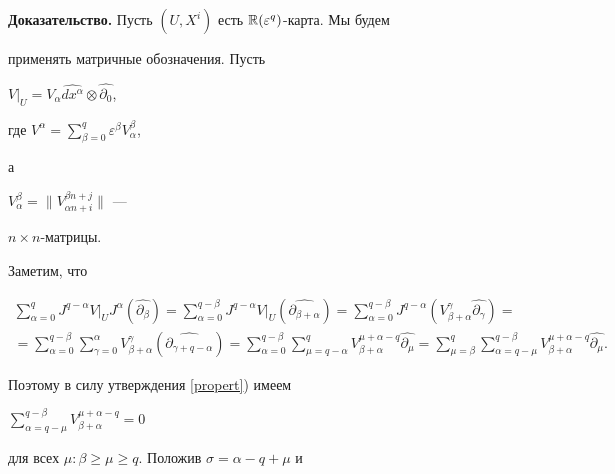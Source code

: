 {\bf Доказательство.} Пусть $(U, X^i)$ есть $\Bbb R(\varepsilon^q)$-карта. Мы будем


применять матричные обозначения. Пусть


$\left. V \right|_U  =


V_\alpha \widehat{dx^\alpha}\otimes\widehat{\partial_0}$,


где $V^\alpha =


\sum\limits_{\beta=0}^q \varepsilon^\beta V_\alpha^\beta$,


а


$V_\alpha^\beta=\|V_{\alpha n + i}^{\beta n + j}\|$ ---


$n\times n$-матрицы.





Заметим, что


\begin{gather*}


\sum_{\alpha=0}^q J^{q-\alpha}\left. V \right|_U J^\alpha


(\widehat{\partial_\beta}) =


\sum_{\alpha=0}^{q-\beta} J^{q-\alpha}\left. V \right|_U


(\widehat{\partial_{\beta+\alpha}}) =


\sum_{\alpha=0}^{q-\beta}J^{q-\alpha}


(V_{\beta+\alpha}^\gamma\widehat{\partial_\gamma}) = \\


%


= \sum_{\alpha=0}^{q-\beta}\sum_{\gamma=0}^\alpha


V_{\beta + \alpha}^\gamma(\widehat{\partial_{\gamma+ q - \alpha}}) =


\sum_{\alpha=0}^{q-\beta}\sum_{\mu=q-\alpha}^q


V_{\beta+\alpha}^{\mu+\alpha-q}\widehat{\partial_\mu} =


\sum_{\mu=\beta}^q\sum_{\alpha=q-\mu}^{q-\beta}


V_{\beta+\alpha}^{\mu+\alpha-q}\widehat{\partial_\mu}.


\end{gather*}


Поэтому в силу утверждения \ref{propert}) имеем


$\sum\limits_{\alpha=q-\mu}^{q-\beta}


V_{\beta+\alpha}^{\mu + \alpha - q} = 0$


для всех $\mu:\beta \ge \mu \ge q$. Положив $\sigma = \alpha - q + \mu$ и


